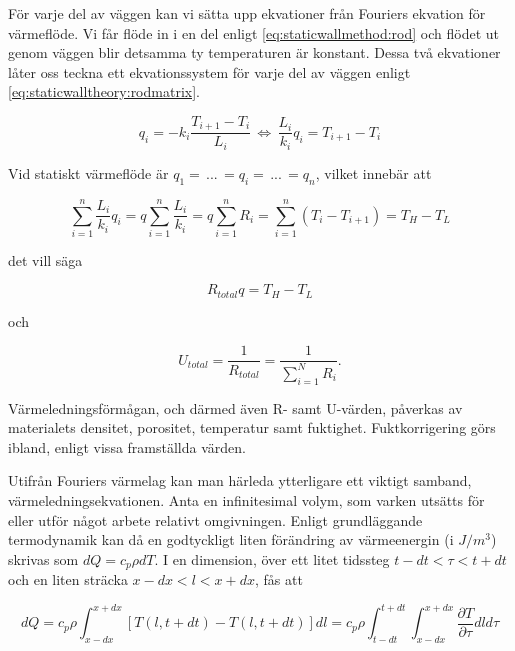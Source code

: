 För varje del av väggen kan vi sätta upp ekvationer från Fouriers ekvation för värmeflöde. Vi får flöde in i en del enligt \eqref{eq:staticwallmethod:rod} och flödet ut genom väggen blir detsamma ty temperaturen är konstant. Dessa två ekvationer låter oss teckna ett ekvationssystem för varje del av väggen enligt \eqref{eq:staticwalltheory:rodmatrix}. \cite{lewis04}

\begin{equation}
\label{eq:staticwallmethod:rod}
q_i = -k_i\frac{T_{i+1}-T_{i}}{L_i} \, \Leftrightarrow \, \frac{L_i}{k_i}q_i = T_{i+1}-T_{i}
\end{equation}

Vid statiskt värmeflöde är $q_1 = \, ... \, = q_i = \, ... \, = q_n$, vilket innebär att

\begin{equation}
\sum_{i=1}^n \frac{L_i}{k_i}q_i = q\sum_{i=1}^n \frac{L_i}{k_i} = q\sum_{i=1}^n R_i = \sum_{i=1}^n \left( T_{i}-T_{i+1} \right) = T_H - T_L 
\end{equation}

det vill säga

\begin{equation}
R_{total}q = T_H - T_L
\end{equation}

och

\begin{equation}
U_{total} = \frac{1}{R_{total}} = \frac{1}{\sum_{i=1}^N R_i}.
\end{equation}

Värmeledningsförmågan, och därmed även R- samt U-värden, påverkas av materialets densitet, porositet, temperatur samt fuktighet. Fuktkorrigering görs ibland, enligt vissa framställda värden.

Utifrån Fouriers värmelag kan man härleda ytterligare ett viktigt samband, värmeledningsekvationen. Anta en infinitesimal volym, som varken utsätts för eller utför något arbete relativt omgivningen. Enligt grundläggande termodynamik kan då en godtyckligt liten förändring av värmeenergin (i $\unit{}{J/m^3}$) skrivas som $dQ = c_p \rho dT$.  I en dimension, över ett litet tidssteg $t-dt< \tau < t+dt$ och en liten sträcka $x-dx < l < x+dx$, fås att

\begin{equation}
dQ = c_p \rho \int_{x-dx}^{x+dx} \left[ T\left( l, t+dt\right) - T\left( l, t+dt\right)\right]dl = c_p \rho \int_{t-dt}^{t+dt} \int_{x-dx}^{x+dx} \frac{\partial T}{\partial \tau} dld\tau
\end{equation}

